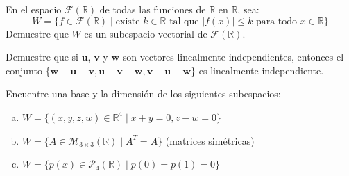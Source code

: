 \begin{prob} En el espacio $\mathcal{F}(\mathbb{R})$ de todas las funciones de $\mathbb{R}$ en $\mathbb{R}$, sea:
$$W = \{f \in \mathcal{F}(\mathbb{R}) \mid \text{existe } k \in \mathbb{R} \text{ tal que } |f(x)| \leq k \text{ para todo } x \in \mathbb{R}\}$$
Demuestre que $W$ es un subespacio vectorial de $\mathcal{F}(\mathbb{R})$.
\end{prob}

\begin{prob} Demuestre que si $\mathbf{u}$, $\mathbf{v}$ y $\mathbf{w}$ son vectores linealmente independientes, entonces el conjunto $\{\mathbf{w} - \mathbf{u} - \mathbf{v}, \mathbf{u} - \mathbf{v} - \mathbf{w}, \mathbf{v} - \mathbf{u} - \mathbf{w}\}$ es linealmente independiente.
\end{prob}

\begin{prob} Encuentre una base y la dimensión de los siguientes subespacios:
\begin{enumerate}[(a)]
\item $W = \{(x, y, z, w) \in \mathbb{R}^4 \mid x + y = 0, z - w = 0\}$
\item $W = \{A \in \mathcal{M}_{3 \times 3}(\mathbb{R}) \mid A^T = A\}$ (matrices simétricas)
\item $W = \{p(x) \in \mathcal{P}_4(\mathbb{R}) \mid p(0) = p(1) = 0\}$
\end{enumerate}
\end{prob}

